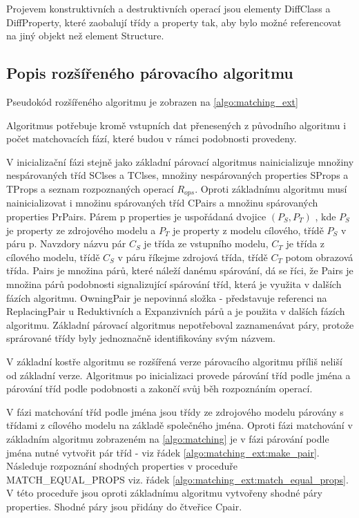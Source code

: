 \documentclass[11pt,twoside,a4paper]{book}
\begin{document}
 Projevem konstruktivních a destruktivních operací jsou elementy DiffClass a
 DiffProperty, které zaobalují třídy a property tak, aby bylo možné referencovat
 na jiný objekt než element Structure. 

\subsection{Popis rozšířeného párovacího algoritmu}
Pseudokód rozšířeného algoritmu je zobrazen na \ref{algo:matching_ext}

Algoritmus potřebuje kromě vstupních dat přenesených z původního algoritmu i
počet matchovacích fází, které budou v rámci podobnosti provedeny.

V inicializační fázi stejně jako základní párovací algoritmus nainicializuje
množiny nespárovaných tříd SClses a TClses, množiny nespárovaných properties
SProps a TProps a seznam rozpoznaných operací $R_{ops}$.
Oproti základnímu algoritmu musí nainicializovat i množinu spárovaných tříd
CPairs a množinu spárovaných properties PrPairs. Párem p properties je
uspořádaná dvojice $(P_S, P_T)$ , kde $P_S$ je property ze zdrojového modelu
a $P_T$ je property z modelu cílového, třídě $P_S$ v páru p. Navzdory názvu pár
$C_S$ je třída ze vstupního modelu, $C_T$ je třída z cílového modelu, třídě
$C_S$ v páru říkejme zdrojová třída, třídě $C_T$ potom obrazová třída.
Pairs je množina párů, které náleží danému spárování, dá se říci, že Pairs je množina
párů podobnosti signalizující spárování tříd, která je využita v dalších fázích
algoritmu. OwningPair je nepovinná složka - představuje referenci na
ReplacingPair u Reduktivních a Expanzivních párů a je použita v dalších fázích
algoritmu. Základní párovací algoritmus nepotřeboval zaznamenávat páry, protože
sprárované třídy byly jednoznačně identifikovány svým názvem.

V základní kostře algoritmu se rozšířená verze párovacího algoritmu příliš
neliší od základní verze.  Algoritmus po inicializaci provede párování tříd
podle jména a párování tříd podle podobnosti a zakončí svůj běh rozpoznáním
operací.

V fázi matchování tříd podle jména jsou třídy ze zdrojového modelu párovány s
třídami z cílového modelu na základě společného jména. Oproti fázi matchování v
základním algoritmu zobrazeném na \ref{algo:matching} je v fázi párování podle
jména nutné vytvořit pár tříd - viz řádek \ref{algo:matching_ext:make_pair}.
Následuje rozpoznání shodných properties v proceduře MATCH\_EQUAL\_PROPS viz.
řádek \ref{algo:matching_ext:match_equal_props}. V této proceduře jsou oproti
základnímu algoritmu vytvořeny shodné páry properties. Shodné páry jsou přidány
do čtveřice Cpair.
\end{document}
